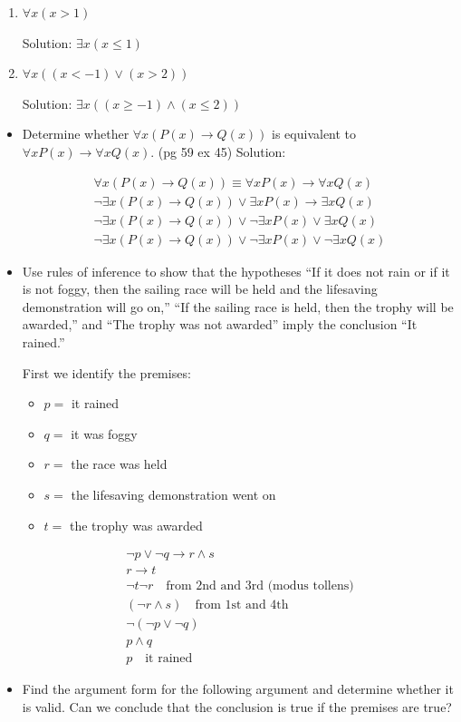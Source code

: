 \documentclass[11pt]{article}
\begin{document}
\begin{enumerate}
\item \(\forall x(x > 1)\)

Solution: \(\exists x(x \leq 1)\)

\item \(\forall x ((x < -1) \lor (x > 2))\)

Solution: \(\exists x (( x \ge -1) \land (x \le 2))\)
\end{enumerate}
\begin{itemize}
\item Determine whether \(\forall x (P(x) \to Q(x))\) is equivalent to \(\forall x P(x) \to \forall x Q(x)\). (pg 59 ex 45)
Solution:

\begin{align}
\forall x (P(x) \to Q(x)) \equiv \forall x P(x) \to \forall x Q(x) \\
\neg \exists x (P(x) \to Q(x)) \lor \exists x P(x) \to \exists x Q(x) \\
\neg \exists x (P(x) \to Q(x)) \lor \neg \exists x P(x) \lor \exists x Q(x) \\
\neg \exists x (P(x) \to Q(x)) \lor \neg \exists x P(x) \lor \neg \exists x Q(x)
\end{align}

\item Use rules of inference to show that the hypotheses “If it does not rain or if it is not foggy, then the sailing race will be held and the lifesaving demonstration will go on,” “If the sailing race is held, then the trophy will be awarded,” and “The trophy was not awarded” imply the conclusion “It rained.”

First we identify the premises:
\begin{itemize}
\item \(p =\) it rained
\item \(q =\) it was foggy
\item \(r =\) the race was held
\item \(s =\) the lifesaving demonstration went on
\item \(t =\) the trophy was awarded
\end{itemize}

\begin{align}
\neg p \lor \neg q \to r \land s \\
r \to t \\
\neg t
\neg r \quad \text{from 2nd and 3rd (modus tollens)} \\
(\neg r \land s) \quad \text{from 1st and 4th} \\
\neg (\neg p \lor \neg q) \\
p \land q \\
p \quad \text{it rained}
\end{align}

\item Find the argument form for the following argument and determine whether it is valid. Can we conclude that the conclusion is true if the premises are true?
\end{itemize}
\end{document}
